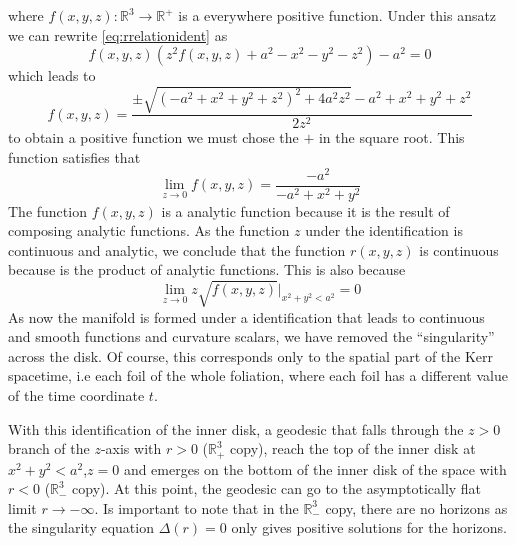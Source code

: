 \begin{Proof}
where $f(x,y,z) : \mathbb{R}^3 \to \mathbb{R}^+$ is a everywhere positive function. Under this ansatz we can rewrite \cref{eq:rrelationident} as
\begin{equation}
 f(x,y,z) \left(z^2 f(x,y,z)+a^2-x^2-y^2-z^2\right)-a^2=0
\end{equation}
which leads to
\begin{equation}
  f(x,y,z)=\frac{\pm \sqrt{\left(-a^2+x^2+y^2+z^2\right)^2+4 a^2 z^2}-a^2+x^2+y^2+z^2}{2 z^2}
\end{equation}
to obtain a positive function we must chose the $+$ in the square root. This function satisfies that
\begin{equation}
 \lim_{z\to0}{f(x,y,z)}=\frac{-a^2}{-a^2+x^2+y^2}
\end{equation}
The function $f(x,y,z)$ is a analytic function because it is the result of composing analytic functions. As the function $z$ under the identification is continuous and analytic, we conclude that the function $r(x,y,z)$ is continuous because is the product of analytic functions. This is also because
\begin{equation}
 \lim_{z \to 0}{ z \sqrt{f(x,y,z)}}|_{x^2+y^2<a^2}=0
\end{equation}
As now the manifold is formed under a identification that leads to continuous and smooth functions and curvature scalars, we have removed the ``singularity'' across the disk. Of course, this corresponds only to the spatial part of the Kerr spacetime, i.e each foil of the whole foliation, where each foil has a different value of the time coordinate $t$.
\end{Proof} 

With this identification of the inner disk, a geodesic that falls through the $z>0$ branch of the $z$-axis with $r>0$ ($\mathbb{R}_+^3$ copy), reach the top of the inner disk at $x^2+y^2<a^2$,$z=0$ and emerges on the bottom of the inner disk of the space with $r<0$ ($\mathbb{R}_-^3$ copy). At this point, the geodesic can go to the asymptotically flat limit $r\to -\infty$. Is important to note that in the $\mathbb{R}_-^3$ copy, there are no horizons as the singularity equation $\Delta(r)=0$ only gives positive solutions for the horizons. 

